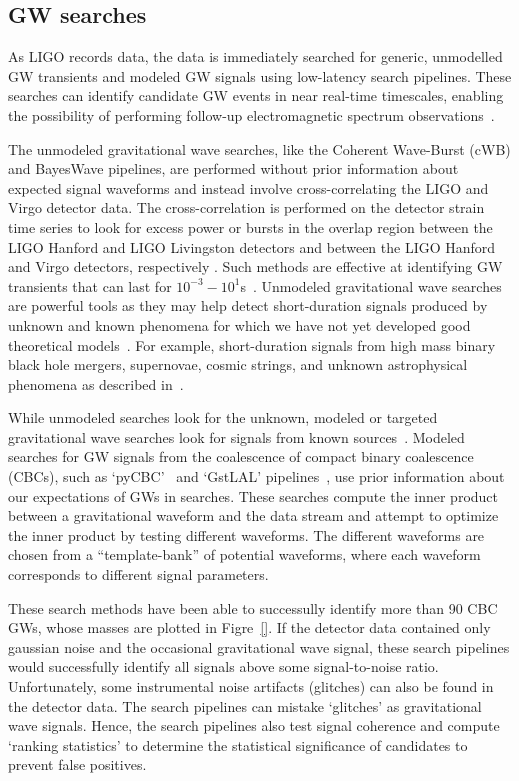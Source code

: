 \subsection{GW searches}  \label{sec:searches}

As LIGO records data, the data is immediately searched for generic, unmodelled GW transients and modeled GW signals using low-latency search pipelines. 
These searches can identify candidate GW events in near real-time timescales, enabling the possibility of performing follow-up electromagnetic spectrum observations~\cite{abbott2018prospects}.

The unmodeled gravitational wave searches, like the Coherent Wave-Burst (cWB) and BayesWave pipelines, are performed without prior information about expected signal waveforms and instead involve cross-correlating the LIGO and Virgo detector data. 
The cross-correlation is performed on the detector strain time series to look for excess power or bursts in the overlap region between the LIGO Hanford and LIGO Livingston detectors and between the LIGO Hanford and Virgo detectors, respectively \cite{LSC:2016}. 
Such methods are effective at identifying GW transients that can last for
$10^{-3}-10^{1}$s~\cite{abbott2016observing}. 
Unmodeled gravitational wave searches are powerful tools as they may help detect short-duration signals produced by unknown and known phenomena for which we have not yet developed good theoretical models~\cite{Abbott:2016blz}. 
For example, short-duration signals from high mass binary black hole mergers, supernovae, cosmic strings, and unknown astrophysical phenomena as described in~\citep{abbott2018prospects}.

While unmodeled searches look for the unknown,  modeled or targeted gravitational wave searches look for signals from known sources~\cite{abbott2016ligo}. 
Modeled searches for GW signals from the coalescence of compact binary coalescence (CBCs), such as `pyCBC'~\cite{biwer2019pycbc} and
`GstLAL' pipelines~\cite{sachdev2019gstlal},  use prior information about our expectations of GWs in searches. These searches compute the inner product between a gravitational waveform and the data stream and attempt to optimize the inner product by testing different waveforms. 
The different waveforms are chosen from a ``template-bank'' of potential waveforms, where each waveform corresponds to different signal parameters. 


These search methods have been able to successully identify more than 90 CBC GWs, whose masses are plotted in Figre~\ref{}.
If the detector data contained only gaussian noise and the occasional gravitational wave signal, these search pipelines would successfully identify all signals above some signal-to-noise ratio. 
Unfortunately, some instrumental noise artifacts (glitches) can also be found in the detector data. 
The search pipelines can mistake `glitches' as gravitational wave signals. 
Hence, the search pipelines also test signal coherence and compute `ranking statistics' to determine the statistical significance of candidates to prevent false positives. 

